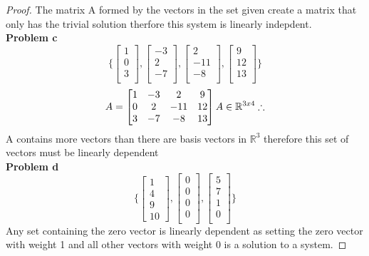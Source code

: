 \documentclass[12pt,a4paper]{article}
\begin{document}
\begin{proof}
  The matrix A formed by the vectors in the set given create a matrix that only has the trivial solution therfore this system is linearly indepdent. \\
  \textbf{Problem c}\\
  \[
    \Bigg\{
    \begin{bmatrix}
        1\\
        0\\
        3\\
    \end{bmatrix}
    ,\begin{bmatrix}
      -3\\
      2\\
      -7\\
    \end{bmatrix}
    ,\begin{bmatrix}
      2\\
      -11\\
      -8\\
    \end{bmatrix},
    \begin{bmatrix}
      9\\
      12\\
      13\\
    \end{bmatrix}
    \Bigg\}
  \]
  \[
    A=\begin{bmatrix}
       1& -3 & 2 & 9 \\
       0 & 2 & -11 & 12\\
       3& -7 & -8 & 13
  \end{bmatrix}\\
  A \in \mathbb{R}^{3x4} \therefore
  \]
  A contains more vectors than there are basis vectors in $\mathbb{R}^3$ therefore this set of vectors must be linearly dependent\\
  \textbf{Problem d}\\
  \[
    \Bigg\{
    \begin{bmatrix}
        1\\
        4\\
        9\\
        10
    \end{bmatrix}
    ,\begin{bmatrix}
      0\\
      0\\
      0\\
      0\\
    \end{bmatrix}
    ,\begin{bmatrix}
      5\\
      7\\
      1\\
      0\\
    \end{bmatrix}
    \Bigg\}
  \]
  Any set containing the zero vector is linearly dependent as setting the zero vector with weight 1 and all other vectors with weight 0 is a solution to a system.
\end{proof}\\
\end{document}
